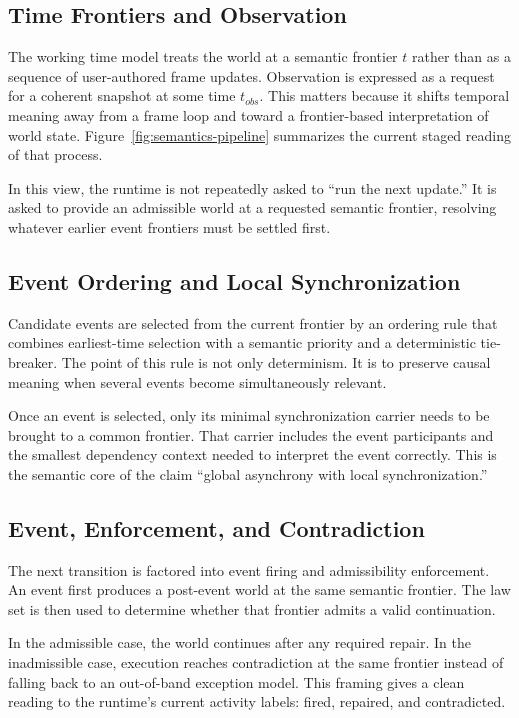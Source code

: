 \documentclass[sigplan,review,anonymous]{acmart}
\begin{document}
\subsection{Time Frontiers and Observation}

The working time model treats the world at a semantic frontier $t$ rather than as a sequence of user-authored frame updates.
Observation is expressed as a request for a coherent snapshot at some time $t_{obs}$.
This matters because it shifts temporal meaning away from a frame loop and toward a frontier-based interpretation of world state.
Figure~\ref{fig:semantics-pipeline} summarizes the current staged reading of that process.

In this view, the runtime is not repeatedly asked to ``run the next update.''
It is asked to provide an admissible world at a requested semantic frontier, resolving whatever earlier event frontiers must be settled first.

\subsection{Event Ordering and Local Synchronization}

Candidate events are selected from the current frontier by an ordering rule that combines earliest-time selection with a semantic priority and a deterministic tie-breaker.
The point of this rule is not only determinism.
It is to preserve causal meaning when several events become simultaneously relevant.

Once an event is selected, only its minimal synchronization carrier needs to be brought to a common frontier.
That carrier includes the event participants and the smallest dependency context needed to interpret the event correctly.
This is the semantic core of the claim ``global asynchrony with local synchronization.''

\subsection{Event, Enforcement, and Contradiction}

The next transition is factored into event firing and admissibility enforcement.
An event first produces a post-event world at the same semantic frontier.
The law set is then used to determine whether that frontier admits a valid continuation.

In the admissible case, the world continues after any required repair.
In the inadmissible case, execution reaches contradiction at the same frontier instead of falling back to an out-of-band exception model.
This framing gives a clean reading to the runtime's current activity labels: fired, repaired, and contradicted.
\end{document}
